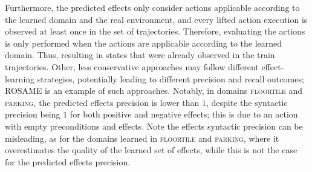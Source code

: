 \documentclass[letterpaper]{article} %
\newcommand{\rosame}{ROSAME\xspace}
\newif\ifaddcomments
\newcommand{\leo}[1]{\ifaddcomments{\textcolor{pink}{[Leonardo: #1]}}\fi}
\begin{document}
Furthermore, the predicted effects only consider actions applicable according to the learned domain and the real environment, and every lifted action execution is observed at least once in the set of trajectories. 
Therefore, evaluating the actions is only performed when the actions are applicable according to the learned domain. Thus, resulting in states that were already observed in the train trajectories.
Other, less conservative approaches may follow different effect-learning strategies, potentially leading to different precision and recall outcomes; \rosame is an example of such approaches.
Notably, in domains \textsc{floortile} and \textsc{parking}, the predicted effects precision is lower than $1$, despite the syntactic precision being $1$ for both positive and negative effects; this is due to an action with empty preconditions and effects. Note the effects syntactic precision can be misleading, as for the domains learned in \textsc{floortile} and \textsc{parking}, where it overestimates the quality of the learned set of effects, while this is not the case for the predicted effects precision.
\leo{comment rosame matchingbw syntactic precision lower than 1 and predicted effs precision equal to 1. TODO: Leonardo}
\end{document}
